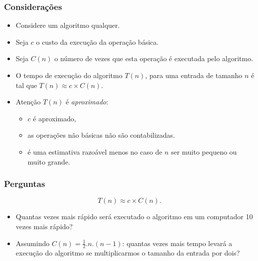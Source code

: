 \documentclass{beamer}
\begin{document}
\begin{frame}
  \frametitle{Considerações}

  \begin{itemize}
  \item Considere um algoritmo qualquer.
  \item Seja $c$ o custo da execução da operação básica.
  \item Seja $C(n)$ o número de vezes que esta operação é executada pelo
    algoritmo.
  \item O tempo de execução do algoritmo $T(n)$, para uma entrada de tamanho $n$
    é tal que $T(n) \approx c \times C(n)$.
  \item Atenção $T(n)$ é \emph{aproximado}: 
    \begin{itemize}
      \item $c$ é aproximado, 
      \item as operações não básicas não são contabilizadas.
      \item é uma estimativa razoável menos no caso de $n$ ser muito pequeno ou
        muito grande.
      \end{itemize}
  \end{itemize}

\end{frame}

\begin{frame}
  \frametitle{Perguntas}

  $$T(n) \approx c \times C(n).$$

  \begin{itemize}
  \item Quantas vezes mais rápido será executado o algoritmo em um computador 10
    vezes mais rápido?

  \item Assumindo $C(n) = \frac{1}{2}.n.(n-1)$: quantas vezes mais tempo levará
    a execução do algoritmo se multiplicarmos o tamanho da entrada por dois?

  \end{itemize}

\end{frame}
\end{document}
